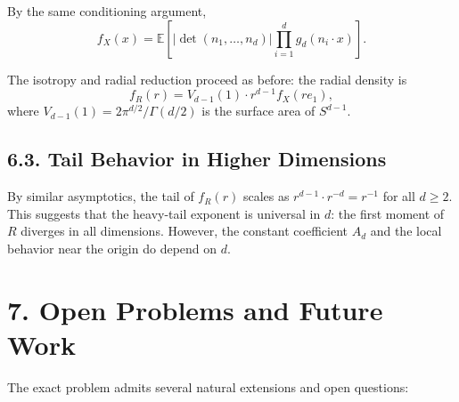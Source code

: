 \documentclass[11pt]{article}
\begin{document}
By the same conditioning argument,
\[
f_X(x) = \mathbb{E}\left[ |\det(n_1,\ldots,n_d)| \prod_{i=1}^d g_d(n_i \cdot x) \right].
\]

The isotropy and radial reduction proceed as before: the radial density is
\[
f_R(r) = V_{d-1}(1) \cdot r^{d-1} f_X(re_1),
\]
where $V_{d-1}(1) = 2\pi^{d/2}/\Gamma(d/2)$ is the surface area of $S^{d-1}$.

\subsection*{6.3. Tail Behavior in Higher Dimensions}

By similar asymptotics, the tail of $f_R(r)$ scales as $r^{d-1} \cdot r^{-d} = r^{-1}$ for all $d \ge 2$.
This suggests that the heavy-tail exponent is universal in $d$: the first moment of $R$ diverges
in all dimensions. However, the constant coefficient $A_d$ and the local behavior near the origin
do depend on $d$.

\section*{7. Open Problems and Future Work}

The exact problem admits several natural extensions and open questions:
\end{document}
